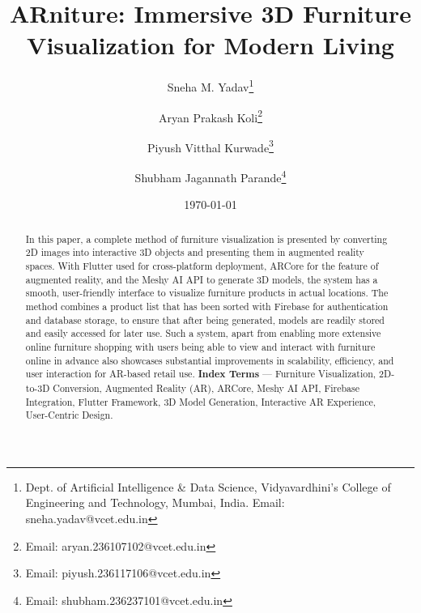 \documentclass[12pt, a4paper]{article}
\title{ARniture: Immersive 3D Furniture Visualization for Modern Living}
\author{Sneha M. Yadav\thanks{Dept. of Artificial Intelligence \& Data Science, Vidyavardhini's College of Engineering and Technology, Mumbai, India. Email: sneha.yadav@vcet.edu.in} \and Aryan Prakash Koli\thanks{Email: aryan.236107102@vcet.edu.in} \and Piyush Vitthal Kurwade\thanks{Email: piyush.236117106@vcet.edu.in} \and Shubham Jagannath Parande\thanks{Email: shubham.236237101@vcet.edu.in}}
\date{\today}
\begin{document}
\maketitle

\begin{abstract}
In this paper, a complete method of furniture visualization is presented by converting 2D images into interactive 3D objects and presenting them in augmented reality spaces. With Flutter used for cross-platform deployment, ARCore for the feature of augmented reality, and the Meshy AI API to generate 3D models, the system has a smooth, user-friendly interface to visualize furniture products in actual locations. The method combines a product list that has been sorted with Firebase for authentication and database storage, to ensure that after being generated, models are readily stored and easily accessed for later use. Such a system, apart from enabling more extensive online furniture shopping with users being able to view and interact with furniture online in advance also showcases substantial improvements in scalability, efficiency, and user interaction for AR-based retail use.
\newline
\noindent\textbf{Index Terms} --- Furniture Visualization, 2D-to-3D Conversion, Augmented Reality (AR), ARCore, Meshy AI API, Firebase Integration, Flutter Framework, 3D Model Generation, Interactive AR Experience, User-Centric Design.
\end{abstract}
\end{document}
